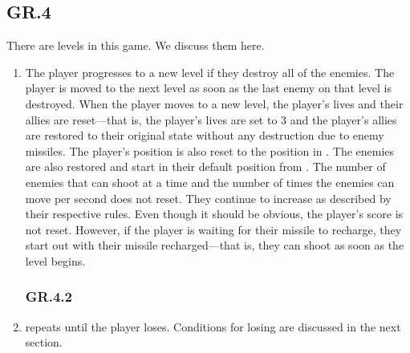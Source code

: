 \documentclass[12pt, letterpaper]{article}
\begin{document}
    \subsection*{GR.4}
    There are levels in this game. We discuss them here. 
    \begin{enumerate}[label=]
        \subsubsection*{GR.4.1}
        \label{levels}
        \item The player progresses to a new level if they destroy all of the enemies. The player is moved to the next level as soon as the last enemy on that level is destroyed. When the player moves to a new level, the player's lives and their allies are reset---that is, the player's lives are set to 3 and the player's allies are restored to their original state without any destruction due to enemy missiles. The player's position is also reset to the position in . The enemies are also restored and start in their default position from . The number of enemies that can shoot at a time and the number of times the enemies can move per second does not reset. They continue to increase as described by their respective rules. Even though it should be obvious, the player's score is not reset. However, if the player is waiting for their missile to recharge, they start out with their missile recharged---that is, they can shoot as soon as the level begins. 
        \subsubsection*{GR.4.2}
        \item {} repeats until the player loses. Conditions for losing are discussed in the next section. 
    \end{enumerate}
\end{document}
